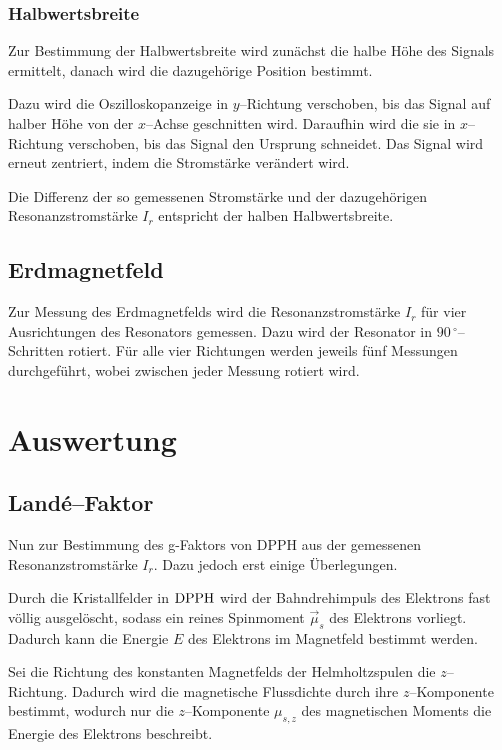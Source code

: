 \documentclass[12pt,a4paper]{scrartcl}
\numberwithin{equation}{section} %
\begin{document}
\subsubsection{Halbwertsbreite}
\label{durchfuxfchrung:Halbwertsbreite}
Zur Bestimmung der Halbwertsbreite wird zunächst die halbe Höhe des Signals ermittelt, danach wird die dazugehörige Position bestimmt.

Dazu wird die Oszilloskopanzeige in $y$--Richtung verschoben, bis das Signal auf halber Höhe von der $x$--Achse geschnitten wird.  Daraufhin wird die sie in $x$--Richtung verschoben, bis das Signal den Ursprung schneidet. Das Signal wird erneut zentriert, indem die Stromstärke verändert wird.

Die Differenz der so gemessenen Stromstärke und der dazugehörigen Resonanzstromstärke $I_r$ entspricht der halben Halbwertsbreite.

\subsection{Erdmagnetfeld}
\label{durchfuxfchrung:Erdmagnetfeld}
Zur Messung des Erdmagnetfelds wird die Resonanzstromstärke $I_r$ für vier Ausrichtungen des Resonators gemessen. Dazu wird der Resonator in $90 \mathrm{\, ^\circ}$--Schritten rotiert. Für alle vier Richtungen werden jeweils fünf Messungen durchgeführt, wobei zwischen jeder Messung rotiert wird.

\clearpage
\hypertarget{auswertung}{\section{Auswertung}\label{auswertung}}

\subsection{Landé--Faktor}
\label{auswertung:Landé--Faktor}

Nun zur Bestimmung des g-Faktors von DPPH aus der gemessenen Resonanzstromstärke $I_r$. Dazu jedoch erst einige Überlegungen.

Durch die Kristallfelder in $\ce{DPPH}$ wird der Bahndrehimpuls des Elektrons fast völlig ausgelöscht, sodass ein reines Spinmoment $\vec{\mu}_s$ des Elektrons vorliegt. Dadurch kann die Energie $E$ des Elektrons im Magnetfeld bestimmt werden.

Sei die Richtung des konstanten Magnetfelds der Helmholtzspulen die $z$--Richtung. Dadurch wird die magnetische Flussdichte durch ihre $z$--Komponente bestimmt, wodurch nur die $z$--Komponente $\mu_{s,z}$ des magnetischen Moments die Energie des Elektrons beschreibt.
\end{document}
